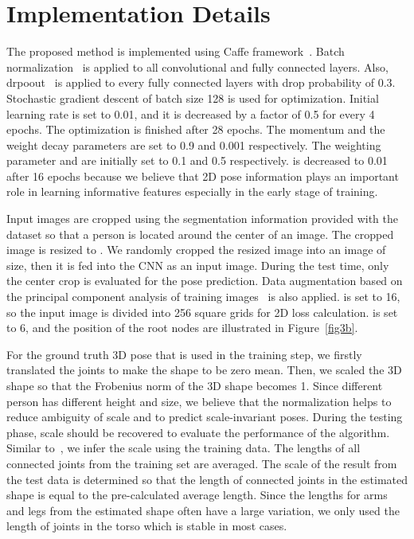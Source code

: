 \documentclass[runningheads]{llncs}
\begin{document}
\section{Implementation Details}
\label{sec:detail}
The proposed method is implemented using Caffe framework~\cite{jia2014caffe}. Batch normalization~\cite{ioffe2015batch} is applied to all convolutional and fully connected layers. Also, drpoout~\cite{srivastava2014dropout} is applied to every fully connected layers with drop probability of 0.3. Stochastic gradient descent of batch size 128 is used for optimization. Initial learning rate is set to 0.01, and it is decreased by a factor of 0.5 for every 4 epochs. The optimization is finished after 28 epochs. The momentum and the weight decay parameters are set to 0.9 and 0.001 respectively. The weighting parameter  and  are initially set to 0.1 and 0.5 respectively.  is decreased to 0.01 after 16 epochs because we believe that 2D pose information plays an important role in learning informative features especially in the early stage of training.

Input images are cropped using the segmentation information provided with the dataset so that a person is located around the center of an image. The cropped image is resized to . We randomly cropped the resized image into an image of  size, then it is fed into the CNN as an input image. During the test time, only the center crop is evaluated for the pose prediction. Data augmentation based on the principal component analysis of training images~\cite{krizhevsky2012imagenet} is also applied.  is set to 16, so the input image is divided into 256 square grids for 2D loss calculation.  is set to 6, and the position of the root nodes are illustrated in Figure~\ref{fig3b}.

For the ground truth 3D pose that is used in the training step, we firstly translated the joints to make the shape to be zero mean. Then, we scaled the 3D shape so that the Frobenius norm of the 3D shape becomes 1. Since different person has different height and size, we believe that the normalization helps to reduce ambiguity of scale and to predict scale-invariant poses. During the testing phase, scale should be recovered to evaluate the performance of the algorithm. Similar to~\cite{Zhou_2016_CVPR}, we infer the scale using the training data. The lengths of all connected joints from the training set are averaged. The scale of the result from the test data is determined so that the length of connected joints in the estimated shape is equal to the pre-calculated average length. Since the lengths for arms and legs from the estimated shape often have a large variation, we only used the length of joints in the torso which is stable in most cases.
\end{document}
